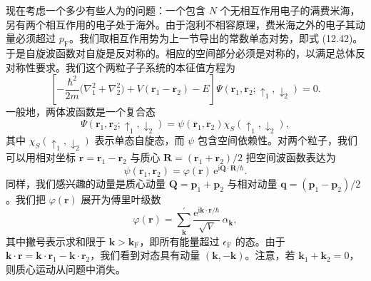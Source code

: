 现在考虑一个多少有些人为的问题：一个包含 $N$ 个无相互作用电子的满费米海，另有两个相互作用的电子处于海外。由于泡利不相容原理，费米海之外的电子其动量必须超过 $p_{\mathrm{F}}$。我们取相互作用势为上一节导出的常数单态对势，即式 (12.42)。于是自旋波函数对自旋是反对称的。相应的空间部分必须是对称的，以满足总体反对称性要求。我们这个两粒子子系统的本征值方程为
\begin{equation*}
\left[-\frac{\hbar^{2}}{2m}\bigl(\nabla_{1}^{2}+\nabla_{2}^{2}\bigr)+V(\mathbf{r}_{1}-\mathbf{r}_{2})-E\right]\Psi(\mathbf{r}_{1},\mathbf{r}_{2};\uparrow_{1},\downarrow_{2})=0.\tag{12.43}
\end{equation*}
一般地，两体波函数是一个复合态
\begin{equation*}
\Psi(\mathbf{r}_{1},\mathbf{r}_{2};\uparrow_{1},\downarrow_{2})=\psi(\mathbf{r}_{1},\mathbf{r}_{2})\chi_{S}(\uparrow_{1},\downarrow_{2}),\tag{12.44}
\end{equation*}
其中 $\chi_{S}(\uparrow_{1},\downarrow_{2})$ 表示单态自旋态，而 $\psi$ 包含空间依赖性。对两个粒子，我们可以用相对坐标 $\mathbf{r}=\mathbf{r}_{1}-\mathbf{r}_{2}$ 与质心 $\mathbf{R}=(\mathbf{r}_{1}+\mathbf{r}_{2})/2$ 把空间波函数表达为
\begin{equation*}
\psi(\mathbf{r}_{1},\mathbf{r}_{2})=\varphi(\mathbf{r})\,\mathrm{e}^{\mathrm{i}\mathbf{Q}\cdot\mathbf{R}/\hbar}.\tag{12.45}
\end{equation*}
同样，我们感兴趣的动量是质心动量 $\mathbf{Q}=\mathbf{p}_{1}+\mathbf{p}_{2}$ 与相对动量 $\mathbf{q}=(\mathbf{p}_{1}-\mathbf{p}_{2})/2$。我们把 $\varphi(\mathbf{r})$ 展开为傅里叶级数
\begin{equation*}
\varphi(\mathbf{r})=\sum_{\mathbf{k}}^{\prime}\frac{\mathrm{e}^{\mathrm{i}\mathbf{k}\cdot\mathbf{r}/\hbar}}{\sqrt{V}}\,\alpha_{\mathbf{k}},\tag{12.46}
\end{equation*}
其中撇号表示求和限于 $\mathbf{k}>\mathbf{k}_{\mathrm{F}}$，即所有能量超过 $\epsilon_{\mathrm{F}}$ 的态。由于 $\mathbf{k}\cdot\mathbf{r}=\mathbf{k}\cdot\mathbf{r}_{1}-\mathbf{k}\cdot\mathbf{r}_{2}$，我们看到对态具有动量 $(\mathbf{k},-\mathbf{k})$。注意，若 $\mathbf{k}_{1}+\mathbf{k}_{2}=0$，则质心运动从问题中消失。

